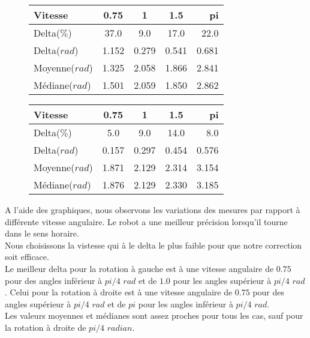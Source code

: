 \documentclass[10pt,a4paper]{article}
\begin{document}
\begin{figure}[!]
    \begin{minipage}[c]{.46\linewidth}
        \centering
        \begin{tabular}{|l|c|c|c|r|}
 		\hline
  		Vitesse & 0.75 & 1 & 1.5 & pi \\
  		\hline
  		Delta($\%$) & 37.0 & 9.0 & 17.0 & 22.0 \\
  		\hline
  		Delta($rad$) & 1.152 & 0.279 & 0.541 & 0.681 \\
  		\hline
  		Moyenne($rad$) & 1.325 & 2.058 & 1.866 & 2.841 \\
  		\hline
  		Médiane($rad$) & 1.501 & 2.059 & 1.850 & 2.862 \\
  		\hline
		\end{tabular}
    \end{minipage}
    \hfill%
    \begin{minipage}[c]{.46\linewidth}
        \centering
        \begin{tabular}{|l|c|c|c|r|}
 		\hline
  		Vitesse & 0.75 & 1 & 1.5 & pi \\
  		\hline
  		Delta($\%$) & 5.0 & 9.0 & 14.0 & 8.0 \\
  		\hline
  		Delta($rad$) & 0.157 & 0.297 & 0.454 & 0.576 \\
  		\hline
  		Moyenne($rad$) & 1.871 & 2.129 & 2.314 & 3.154 \\
  		\hline
  		Médiane($rad$) & 1.876 & 2.129 & 2.330 & 3.185 \\
  		\hline
		\end{tabular}
    \end{minipage}
\end{figure} 

\vspace{5mm}
A l'aide des graphiques, nous observons les variations des mesures par rapport à différente vitesse angulaire. Le robot a une meilleur précision lorsqu'il tourne dans le sens horaire.\\
Nous choisissons la vistesse qui à le delta le plus faible pour que notre correction soit efficace.\\
Le meilleur delta pour la rotation à gauche est à une vitesse angulaire de $0.75$ pour des angles inférieur à $pi/4$ $rad$ et de $1.0$ pour les angles supérieur à $pi/4$ $rad$. Celui pour la rotation à droite est à une vitesse angulaire de $0.75$ pour des angles supérieur à $pi/4$ $rad$ et de $pi$ pour les angles inférieur à $pi/4$ $rad$.\\
Les valeurs moyennes et médianes sont assez proches pour tous les cas, sauf pour la rotation à droite de $pi/4$ $radian$.\\
\end{document}
